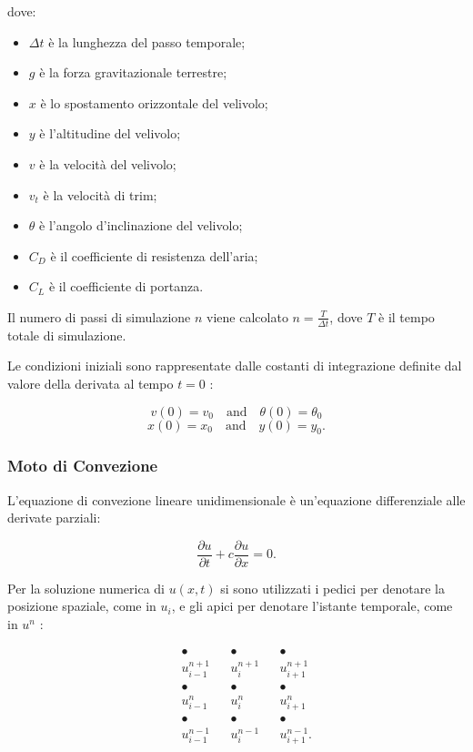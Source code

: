 \noindent
dove:
\begin{itemize}
\item $\Delta t$ è la lunghezza del passo temporale;
\item $g$ è la forza gravitazionale terrestre;
\item $x$ è lo spostamento orizzontale del velivolo;
\item $y$ è l'altitudine del velivolo;
\item $v$ è la velocità del velivolo;
\item $v_t$ è la velocità di trim;
\item $\theta$ è l'angolo d'inclinazione del velivolo;
\item $C_D$ è il coefficiente di resistenza dell'aria;
\item $C_L$ è il coefficiente di portanza.
\end{itemize}

\noindent
Il numero di passi di simulazione $n$ viene calcolato $n = \frac{T}{\Delta t}$, dove $T$ è il
tempo totale di simulazione.

\noindent
Le condizioni iniziali sono rappresentate dalle costanti di integrazione definite dal valore della derivata al tempo $t = 0$ :

$$
v(0) = v_0 \quad \text{and} \quad \theta(0) = \theta_0
$$
$$
x(0) = x_0 \quad \text{and} \quad y(0) = y_0.
$$

\subsubsection*{Moto di Convezione}
L’equazione di convezione lineare unidimensionale è un’equazione differenziale alle derivate parziali: 

\begin{equation}
\frac{\partial u}{\partial t} + c \frac{\partial u}{\partial x} = 0.
\end{equation}

\noindent
Per la soluzione numerica di $u(x,t)$ si sono utilizzati i pedici per denotare la posizione spaziale, come in $u_i$, e gli apici per denotare l’istante temporale, come in $u^n$ : 

$$
\begin{matrix}
& &\bullet & & \bullet & &  \bullet \\
& &u^{n+1}_{i-1} & & u^{n+1}_i & & u^{n+1}_{i+1} \\
& &\bullet & & \bullet & &  \bullet \\
& &u^n_{i-1} & & u^n_i & & u^n_{i+1} \\
& &\bullet & & \bullet & &  \bullet \\
& &u^{n-1}_{i-1} & & u^{n-1}_i & & u^{n-1}_{i+1}. \\
\end{matrix}
$$

